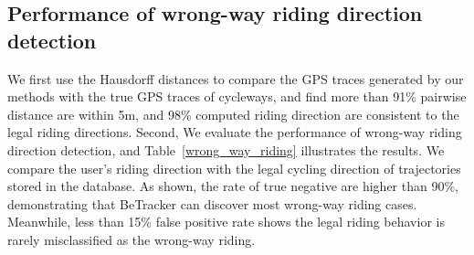 \documentclass{sigchi-ext}
\def\sysname{BeTracker }
\begin{document}
\subsection{Performance of wrong-way riding direction detection}
We first use the Hausdorff distances to compare the GPS traces generated by our methods with the true GPS traces of cycleways, and find more than 91\% pairwise distance are within 5m, and 98\% computed riding direction are consistent to the legal riding directions.  
Second,  We  evaluate the  performance of wrong-way riding direction detection, and  Table~\ref{wrong_way_riding} illustrates the results. 
We compare the user's riding direction with the legal cycling direction of trajectories stored in the database.  
As shown, the rate of true negative are higher than 90\%, demonstrating that \sysname can discover most wrong-way riding cases. Meanwhile, less than 15\% false positive rate shows the legal riding behavior is rarely misclassified as the wrong-way riding.  

\end{document}
